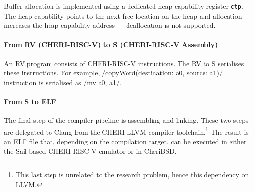 \documentclass[main.tex]{subfiles}
\begin{document}
Buffer allocation is implemented using a dedicated heap capability register \texttt{ctp}. The heap capability points to the next free location on the heap and allocation increases the heap capability address — deallocation is not supported.

\paragraph{From RV (CHERI-RISC-V) to S (CHERI-RISC-V Assembly)} An RV program consists of CHERI-RISC-V instructions. The RV to S  serialises these instructions. For example, \iil/copyWord(destination: a0, source: a1)/ instruction is serialised as \irv/mv a0, a1/.

\paragraph{From S to ELF} The final step of the compiler pipeline is assembling and linking. These two steps are delegated to Clang from the CHERI-LLVM compiler toolchain.\footnote{This last step is unrelated to the research problem, hence this dependency on LLVM.} The result is an ELF file that, depending on the compilation target, can be executed in either the Sail-based CHERI-RISC-V emulator or in CheriBSD.

\biblio{}
\onlyinsubfile{\glsaddall\printglossaries}
\end{document}
